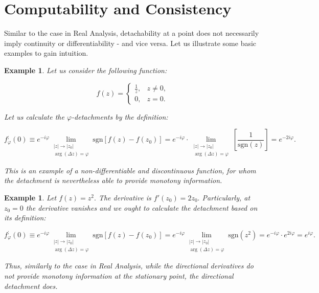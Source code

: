 \documentclass[11pt]{book}
\newtheorem{exm}[thm]{Example}
\begin{document}
\section{Computability and Consistency}
Similar to the case in Real Analysis, detachability at a point does not necessarily imply continuity or differentiability - and vice versa. Let us illustrate some basic examples to gain intuition.

\begin{exm}Let us consider the following function:

$$f\left(z\right)=\begin{cases}
\frac{1}{z}, & z\neq0,\\
0, & z=0.
\end{cases}$$

Let us calculate the $\varphi$-detachments by the definition:

$$f_{\varphi}^{;}\left(0\right)\equiv e^{-i\varphi}\underset{\begin{array}{c}
\left|z\right|\to\left|z_{0}\right|\\
\arg\left(\Delta z\right)=\varphi
\end{array}}{\lim}\text{sgn}\left[f\left(z\right)-f\left(z_{0}\right)\right]=e^{-i\varphi}\cdot\underset{\begin{array}{c}
\left|z\right|\to\left|z_{0}\right|\\
\arg\left(\Delta z\right)=\varphi
\end{array}}{\lim}\left[\frac{1}{\text{sgn}\left(z\right)}\right]=e^{-2i\varphi}.$$

This is an example of a non-differentiable and discontinuous function, for whom the detachment is nevertheless able to provide monotony information.
\end{exm}

\begin{exm}Let $f\left(z\right)=z^{2}.$ The derivative is $f'\left(z_{0}\right)=2z_{0}.$ Particularly, at $z_{0}=0$ the derivative vanishes and we ought to calculate the detachment based on its definition:

$$f_{\varphi}^{;}\left(0\right)\equiv e^{-i\varphi}\underset{\begin{array}{c}
\left|z\right|\to\left|z_{0}\right|\\
\arg\left(\Delta z\right)=\varphi
\end{array}}{\lim}\text{sgn}\left[f\left(z\right)-f\left(z_{0}\right)\right]=e^{-i\varphi}\underset{\begin{array}{c}
\left|z\right|\to\left|z_{0}\right|\\
\arg\left(\Delta z\right)=\varphi
\end{array}}{\lim}\text{sgn}\left(z^{2}\right)=e^{-i\varphi}\cdot e^{2i\varphi}=e^{i\varphi}.$$

Thus, similarly to the case in Real Analysis, while the directional derivatives do not provide monotony information at the stationary point, the directional detachment does.
\end{exm}
\end{document}
